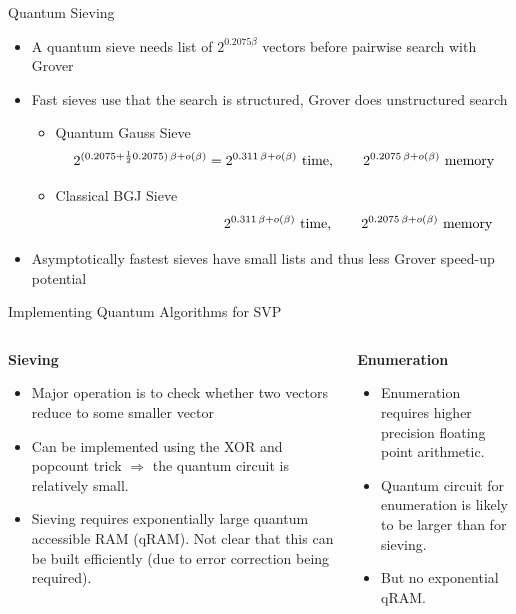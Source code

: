 \documentclass[table,10pt,aspectratio=169]{beamer}
\begin{document}
\begin{frame}[label={sec:org2d3e741}]{Quantum Sieving}
\begin{itemize}
\item A quantum sieve needs list of \(2^{0.2075 \beta}\) vectors before pairwise search with Grover

\item Fast sieves use that the search is structured, Grover does unstructured search
\begin{itemize}
\item Quantum Gauss Sieve \[2^{(0.2075 + \frac{1}{2} 0.2075)\, \beta + o(\beta)} = 2^{0.311\, \beta + o(\beta)} \textnormal{ time},\qquad 2^{0.2075\, \beta + o(\beta)} \textnormal{ memory}\]
\item Classical BGJ Sieve  \[\phantom{2^{(0.2075 + \frac{1}{2} 0.2075)\, \beta + o(\beta)} = }2^{0.311\, \beta + o(\beta)}\textnormal{ time}, \qquad 2^{0.2075\, \beta + o(\beta)} \textnormal{ memory}\]
\end{itemize}
\item Asymptotically fastest sieves have small lists and thus less Grover speed-up potential
\end{itemize}
\end{frame}

\begin{frame}[label={sec:orga44873e}]{Implementing Quantum Algorithms for SVP}
\begin{columns}[t]
\begin{column}{0.5\columnwidth}
\textbf{Sieving}

\begin{itemize}
\item Major operation is to check whether two vectors reduce to some smaller vector
\item Can be implemented using the XOR and popcount trick \(\Rightarrow\) the quantum circuit is relatively small.
\item Sieving requires exponentially large quantum accessible RAM (qRAM). Not clear that this can be built efficiently (due to error correction being required).
\end{itemize}
\end{column}

\begin{column}{0.5\columnwidth}
\textbf{Enumeration}

\begin{itemize}
\item Enumeration requires higher precision floating point arithmetic.
\item Quantum circuit for enumeration is likely to be larger than for sieving.
\item But no exponential qRAM.
\end{itemize}
\end{column}
\end{columns}
\end{frame}
\end{document}
